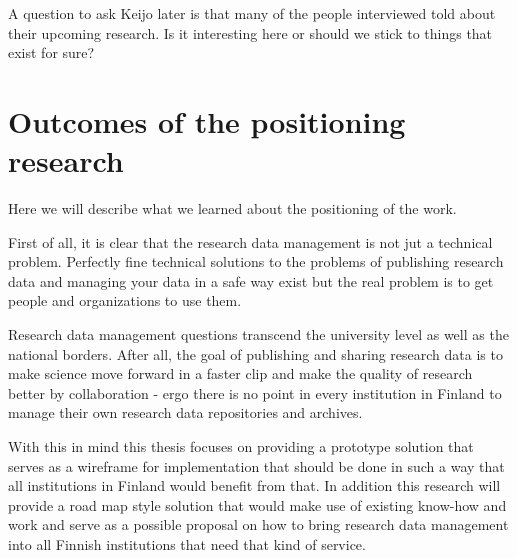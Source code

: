 A question to ask Keijo later is that many of the people interviewed told about
their upcoming research. Is it interesting here or should we stick to things
that exist for sure?

\section{Outcomes of the positioning research}
\label{sec:positioning_outcomes}

Here we will describe what we learned about the positioning of the work.

First of all, it is clear that the research data management is not jut a
technical problem. Perfectly fine technical solutions to the problems of
publishing research data and managing your data in a safe way exist but the
real problem is to get people and organizations to use them.

Research data management questions transcend the university level as well
as the national borders. After all, the goal of publishing and sharing
research data is to make science move forward in a faster clip and make the
quality of research better by collaboration - ergo there is no point in every
institution in Finland to manage their own research data repositories and
archives.

With this in mind this thesis focuses on providing a prototype solution that
serves as a wireframe for implementation that should be done in such a way that
all institutions in Finland would benefit from that. In addition this research
will provide a road map style solution that would make use of existing know-how
and work and serve as a possible proposal on how to bring research data
management into all Finnish institutions that need that kind of service.
